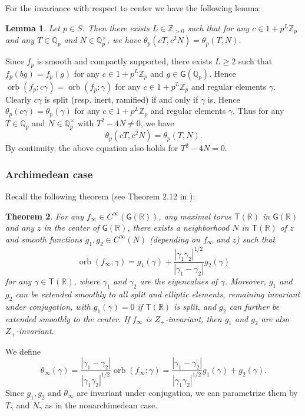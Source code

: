 \documentclass[10pt,oneside,reqno]{amsart}
\makeatletter
\newcommand\QQ{\mathbb{Q}}
\newcommand\RR{\mathbb{R}}
\newcommand\ZZ{\mathbb{Z}}
\newcommand\G{\mathsf{G}}
\newcommand\T{\mathsf{T}}
\DeclareMathOperator\orb{orb}
\renewcommand\geq{\geqslant}
\theoremstyle{THEOREM}
\newtheorem{theorem}{Theorem}[section]
\newtheorem{lemma}[theorem]{Lemma}
\theoremstyle{DEFINITION}
\theoremstyle{EXERCISE}
\numberwithin{equation}{section}
\renewenvironment{proof}[1][\proofname]{\par
  \vspace{-6pt}
  \pushQED{\qed}
  \normalfont \topsep6\p@\@plus6\p@\relax
  \trivlist
  \item[\hskip\labelsep\rmfamily\bfseries
    #1\@addpunct{:}]\ignorespaces
}{
  \popQED\endtrivlist\@endpefalse
  \vspace{-6pt}
}
\makeatother
\begin{document}
For the invariance with respect to center we have the following lemma:
\begin{lemma}\label{lem:orbitalintegralsmooth}
Let $p\in S$. Then there exists $L\in \ZZ_{>0}$ such that for any $c\in 1+p^{L}\ZZ_p$ and any $T\in \QQ_p$ and $N\in \QQ_p^\times$, we have $\theta_p(cT,c^2N)=\theta_p(T,N)$.
\end{lemma}
\begin{proof}
Since $f_p$ is smooth and compactly supported, there exists $L\geq 2$ such that $f_p(bg)=f_p(g)$ for any $c\in 1+p^{L}\ZZ_p$ and $g\in \G(\QQ_p)$. Hence $\orb(f_p;c\gamma)=\orb(f_p;\gamma)$ for any $c\in 1+p^{L}\ZZ_p$ and regular elements $\gamma$. Clearly $c\gamma$ is split (resp. inert, ramified) if and only if $\gamma$ is. Hence $\theta_p(c\gamma)=\theta_p(\gamma)$ for any $c\in 1+p^{L}\ZZ_p$ and regular elements $\gamma$. Thus for any $T\in \QQ_p$ and $N\in \QQ_p^\times$ with $T^2-4N\neq 0$, we have
\[
\theta_p(cT,c^2N)=\theta_p(T,N).
\]
By continuity, the above equation also holds for $T^2-4N=0$.
\end{proof}

\subsubsection{Archimedean case}
Recall the following theorem  (see Theorem 2.12 in \cite{cheng2025}):
\begin{theorem}\label{thm:archimedeanintegral}
For any $f_\infty\in C^\infty(\G(\RR))$, any maximal torus $\T(\RR)$ in $\G(\RR)$ and any $z$ in the center of $\G(\RR)$, there exists a neighborhood $N$ in $\T(\RR)$ of $z$ and smooth functions $g_1,g_2\in C^\infty(N)$ (depending on $f_\infty$ and $z$) such that
\begin{equation}\label{eq:archimedeanintegral}
\orb(f_\infty;\gamma)=g_1(\gamma)+\frac{|\gamma_1\gamma_2|^{1/2}}{|\gamma_1-\gamma_2|}g_2(\gamma)
\end{equation}
for any $\gamma\in \T(\RR)$, where $\gamma_1$ and $\gamma_2$ are the eigenvalues of $\gamma$.  Moreover, $g_1$ and $g_2$ can be extended smoothly to all split and elliptic elements, remaining invariant under conjugation, with $g_1(\gamma)=0$ if $\T(\RR)$ is split, and $g_2$ can further be extended smoothly to the center. If $f_\infty$ is $Z_+$-invariant, then $g_1$ and $g_2$ are also $Z_+$-invariant.
\end{theorem}

We define
\[
\theta_\infty(\gamma)=\frac{|\gamma_1-\gamma_2|}{|\gamma_1\gamma_2|^{1/2}}\orb(f_\infty;\gamma)= \frac{|\gamma_1-\gamma_2|}{|\gamma_1\gamma_2|^{1/2}}g_1(\gamma)+g_2(\gamma).
\]
Since $g_1,g_2$ and $\theta_\infty$ are invariant under conjugation, we can parametrize them by $T_\gamma$ and $N_\gamma$ as in the nonarchimedean case.
\end{document}
